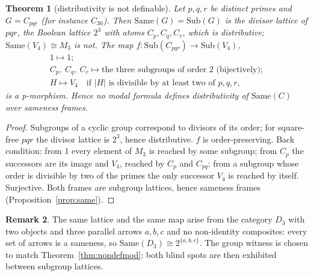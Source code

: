 \documentclass[11pt]{amsart}
\newtheorem{thm}{Theorem}[section]
\theoremstyle{definition}
\newtheorem{rem}[thm]{Remark}
\newcommand{\Same}{\mathrm{Same}}
\newcommand{\Sub}{\mathrm{Sub}}
\begin{document}
\begin{thm}[distributivity is not definable]\label{thm:nondef}
Let $p,q,r$ be distinct primes and $G=C_{pqr}$ (for instance $C_{30}$). Then
$\Same(G)=\Sub(G)$ is the divisor lattice of $pqr$, the Boolean lattice $2^3$
with atoms $C_p,C_q,C_r$, which is distributive; $\Same(V_4)\cong M_3$ is not.
The map $f\colon\Sub(C_{pqr})\to\Sub(V_4)$,
\[
\begin{array}{l}
1\mapsto1;\\[2pt]
C_p,\ C_q,\ C_r\mapsto\text{the three subgroups of order }2\text{ (bijectively)};\\[2pt]
H\mapsto V_4\quad\text{if }|H|\text{ is divisible by at least two of }p,q,r,
\end{array}
\]
is a p-morphism. Hence no modal formula defines distributivity of $\Same(C)$
over sameness frames.
\end{thm}
\begin{proof}
Subgroups of a cyclic group correspond to divisors of its order; for
square-free $pqr$ the divisor lattice is $2^3$, hence distributive. $f$ is
order-preserving. Back condition: from $1$ every element of $M_3$ is reached by
some subgroup; from $C_p$ the successors are its image and $V_4$, reached by
$C_p$ and $C_{pq}$; from a subgroup whose order is divisible by two of the
primes the only successor $V_4$ is reached by itself. Surjective. Both frames are subgroup lattices, hence
sameness frames (Proposition~\ref{prop:same}).
\end{proof}

\begin{rem}
The same lattice and the same map arise from the category $D_3$ with two
objects and three parallel arrows $a,b,c$ and no non-identity composites: every
set of arrows is a sameness, so $\Same(D_3)\cong2^{\{a,b,c\}}$. The group
witness is chosen to match Theorem~\ref{thm:nondefmod}: both blind spots are
then exhibited between subgroup lattices.
\end{rem}
\end{document}
